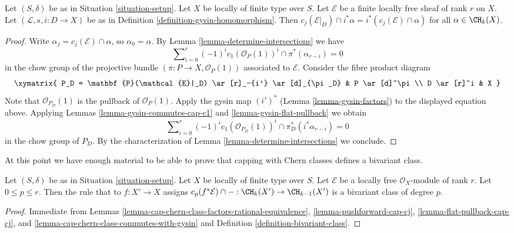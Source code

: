\begin{lemma}
\label{lemma-cap-chern-class-commutes-with-gysin}
Let $(S, \delta)$ be as in Situation \ref{situation-setup}.
Let $X$ be locally of finite type over $S$.
Let $\mathcal{E}$ be a finite locally free sheaf of rank $r$ on $X$.
Let $(\mathcal{L}, s, i : D \to X)$ be as in
Definition \ref{definition-gysin-homomorphism}.
Then $c_j(\mathcal{E}|_D) \cap i^*\alpha = i^*(c_j(\mathcal{E}) \cap \alpha)$
for all $\alpha \in \CH_k(X)$.
\end{lemma}

\begin{proof}
Write $\alpha_j = c_j(\mathcal{E}) \cap \alpha$, so $\alpha_0 = \alpha$.
By Lemma \ref{lemma-determine-intersections} we have
$$
\sum\nolimits_{i = 0}^r
(-1)^i c_1(\mathcal{O}_P(1))^i \cap
\pi^*(\alpha_{r - i}) = 0
$$
in the chow group of the projective bundle
$(\pi : P \to X, \mathcal{O}_P(1))$
associated to $\mathcal{E}$. Consider the fibre product diagram
$$
\xymatrix{
P_D = \mathbf{P}(\mathcal{E}|_D) \ar[r]_-{i'} \ar[d]_{\pi_D} &
P \ar[d]^\pi \\
D \ar[r]^i & X
}
$$
Note that $\mathcal{O}_{P_D}(1)$ is the pullback of $\mathcal{O}_P(1)$.
Apply the gysin map $(i')^*$ (Lemma \ref{lemma-gysin-factors}) to the
displayed equation above.
Applying Lemmas \ref{lemma-gysin-commutes-cap-c1} and
\ref{lemma-gysin-flat-pullback} we obtain
$$
\sum\nolimits_{i = 0}^r
(-1)^i c_1(\mathcal{O}_{P_D}(1))^i \cap
\pi_D^*(i^*\alpha_{r - i}) = 0
$$
in the chow group of $P_D$.
By the characterization of Lemma \ref{lemma-determine-intersections}
we conclude.
\end{proof}

\noindent
At this point we have enough material to be able to prove that
capping with Chern classes defines a bivariant class.

\begin{lemma}
\label{lemma-cap-cp-bivariant}
Let $(S, \delta)$ be as in Situation \ref{situation-setup}.
Let $X$ be locally of finite type over $S$.
Let $\mathcal{E}$ be a locally free $\mathcal{O}_X$-module
of rank $r$. Let $0 \leq p \leq r$.
Then the rule that to $f : X' \to X$ assigns
$c_p(f^*\mathcal{E}) \cap - : \CH_k(X') \to \CH_{k - 1}(X')$
is a bivariant class of degree $p$.
\end{lemma}

\begin{proof}
Immediate from Lemmas
\ref{lemma-cap-chern-class-factors-rational-equivalence},
\ref{lemma-pushforward-cap-cj},
\ref{lemma-flat-pullback-cap-cj}, and
\ref{lemma-cap-chern-class-commutes-with-gysin}
and Definition \ref{definition-bivariant-class}.
\end{proof}

